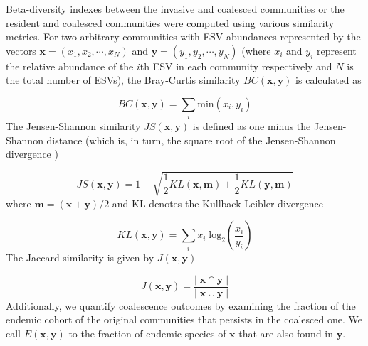 \documentclass[a4paper,10pt]{article}
\begin{document}
Beta-diversity indexes between the invasive and coalesced communities
or the resident and coalesced communities were computed using various
similarity metrics. For two arbitrary communities with
ESV abundances represented by the vectors
$\mathbf{x} = \left( x_1, x_2, \cdots, x_N \right)$
and
$\mathbf{y} = \left( y_1, y_2, \cdots, y_N \right)$
(where $x_i$ and $y_i$ represent the relative abundance of the $i$th ESV in
each community respectively and $N$ is the total number of ESVs), the Bray-Curtis
similarity $BC \left( \mathbf{x}, \mathbf{y} \right)$ is calculated as
\cite{Bray1957}

\begin{equation}
BC \left( \mathbf{x}, \mathbf{y} \right) = 
\sum_i \mathrm{min} \left( x_i , y_i \right)
\label{eq:bray-curtis}
\end{equation}
%
The Jensen-Shannon similarity
$JS \left( \mathbf{x}, \mathbf{y} \right)$
is defined as one minus the Jensen-Shannon distance (which is, in turn,
the square root of the Jensen-Shannon divergence \cite{Lin1991})

\begin{equation}
JS \left( \mathbf{x}, \mathbf{y} \right) = 
1 - \sqrt{\frac{1}{2}KL \left( \mathbf{x}, \mathbf{m} \right) +
\frac{1}{2}KL \left( \mathbf{y}, \mathbf{m} \right)}
\label{eq:jensen-shannon}
\end{equation}
%
where $\mathbf{m} = \left( \mathbf{x} + \mathbf{y} \right)/2$ and KL denotes the
Kullback-Leibler divergence \cite{Kullback1951}

\begin{equation}
KL \left( \mathbf{x}, \mathbf{y} \right) = 
\sum_i x_i \; \mathrm{log_2} \left( \frac{x_i}{y_i} \right)
\label{eq:kullback-leibler}
\end{equation}
%
The Jaccard similarity is given by
$J \left( \mathbf{x}, \mathbf{y} \right)$ \cite{Jaccard1912}

\begin{equation}
J \left( \mathbf{x}, \mathbf{y} \right) = 
\frac{\left|\; \mathbf{x} \cap \mathbf{y} \;\right|}
{\left|\; \mathbf{x} \cup \mathbf{y} \;\right|}
\label{eq:jaccard}
\end{equation}
%
Additionally, we quantify coalescence outcomes by examining the fraction of the endemic
cohort of the original communities that persists in the coalesced one. We call
$E \left( \mathbf{x}, \mathbf{y} \right)$ to the fraction of endemic species of
$\mathbf{x}$ that are also found in $\mathbf{y}$.

\iffalse
\end{document}
